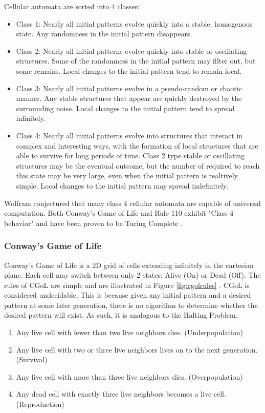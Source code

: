 Cellular automata are sorted into 4 classes:
\begin{itemize}[leftmargin=2cm]
    \item Class 1: Nearly all initial patterns evolve quickly into a stable, homogenous state.
    Any randomness in the initial pattern disappears.
    \item Class 2: Nearly all initial patterns evolve quickly into stable or oscillating structures.
    Some of the randomness in the initial pattern may filter out, but some remains.
    Local changes to the initial pattern tend to remain local.
    \item Class 3: Nearly all initial patterns evolve in a pseudo-random or chaotic manner.
    Any stable structures that appear are quickly destroyed by the surrounding noise.
    Local changes to the initial pattern tend to spread infinitely.
    \item Class 4: Nearly all initial patterns evolve into structures that interact in complex and interesting ways, with the formation of local structures that are able to survive for long periods of time.
    Class 2 type stable or oscillating structures may be the eventual outcome, but the number of required to reach this state may be very large, even when the initial pattern is realtively simple.
    Local changes to the initial pattern may spread indefinitely.
\end{itemize}

Wolfram conjectured that many class 4 cellular automata are capable of universal computation.
Both Conway's Game of Life and Rule 110 exhibit "Class 4 behavior" and have been proven to be Turing Complete \cite{CGoLTM,CellAutBook}.

\subsubsection{Conway's Game of Life}\label{subsubsec:CGoL}

Conway's Game of Life is a 2D grid of cells extending infinitely in the cartesian plane.
Each cell may switch between only 2 states: Alive (On) or Dead (Off).
The rules of CGoL are simple and are illustrated in Figure \ref{fig:cgolrules} \cite{CGoLImg}.
CGoL is considered undecidable.
This is because given any initial pattern and a desired pattern at some later generation, there is no algorithm to determine whether the desired pattern will exist.
As such, it is analogous to the Halting Problem.

\begin{enumerate}
    \item Any live cell with fewer than two live neighbors dies. (Underpopulation)
    \item Any live cell with two or three live neighbors lives on to the next generation. (Survival)
    \item Any live cell with more than three live neighbors dies. (Overpopulation)
    \item Any dead cell with exactly three live neighbors becomes a live cell. (Reproduction)
\end{enumerate}

